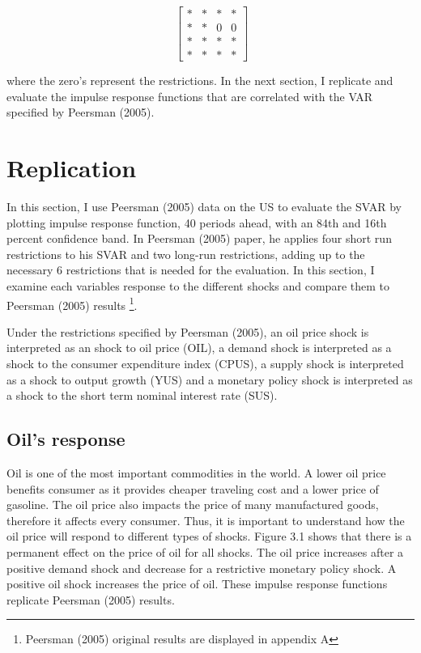 \documentclass[11pt,preprint, authoryear]{elsarticle}
\numberwithin{equation}{section}
\numberwithin{figure}{section}
\numberwithin{table}{section}
\let\rmarkdownfootnote\footnote%
\def\footnote{\protect\rmarkdownfootnote}
\begin{document}
\[\ \begin{bmatrix} *& *& *& * \\
*& *& 0 & 0 \\
*& *& *& * \\
*& *& * & * \end{bmatrix} \]

where the zero's represent the restrictions. In the next section, I
replicate and evaluate the impulse response functions that are
correlated with the VAR specified by Peersman (2005).

\hypertarget{replication}{%
\section{Replication}\label{replication}}

In this section, I use Peersman (2005) data on the US to evaluate the
SVAR by plotting impulse response function, 40 periods ahead, with an
84th and 16th percent confidence band. In Peersman (2005) paper, he
applies four short run restrictions to his SVAR and two long-run
restrictions, adding up to the necessary 6 restrictions that is needed
for the evaluation. In this section, I examine each variables response
to the different shocks and compare them to Peersman (2005) results
\footnote{Peersman (2005) original results are displayed in appendix A}.

Under the restrictions specified by Peersman (2005), an oil price shock
is interpreted as an shock to oil price (OIL), a demand shock is
interpreted as a shock to the consumer expenditure index (CPUS), a
supply shock is interpreted as a shock to output growth (YUS) and a
monetary policy shock is interpreted as a shock to the short term
nominal interest rate (SUS).

\hypertarget{oils-response}{%
\subsection{Oil's response}\label{oils-response}}

Oil is one of the most important commodities in the world. A lower oil
price benefits consumer as it provides cheaper traveling cost and a
lower price of gasoline. The oil price also impacts the price of many
manufactured goods, therefore it affects every consumer. Thus, it is
important to understand how the oil price will respond to different
types of shocks. Figure 3.1 shows that there is a permanent effect on
the price of oil for all shocks. The oil price increases after a
positive demand shock and decrease for a restrictive monetary policy
shock. A positive oil shock increases the price of oil. These impulse
response functions replicate Peersman (2005) results.
\end{document}
